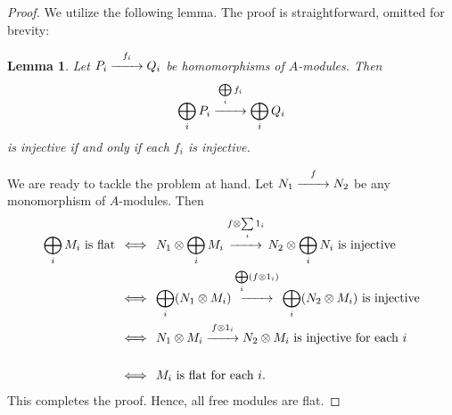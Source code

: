 \documentclass[11pt]{article}
\newtheorem{lemma}{Lemma}
\renewcommand{\longrightarrow}{\xrightarrow{\hspace*{0.7cm}}}
\begin{document}
\begin{proof}
  We utilize the following lemma. The proof is straightforward, omitted for brevity:
  \begin{adjustwidth}{0.5cm}{}
    \begin{lemma}
      Let $P_{i} \stackrel{f_{i}}{\longrightarrow}  Q_{i}$ be homomorphisms of $A$-modules. Then
      \[
        \bigoplus\limits_{i} P_{i} \stackrel{\bigoplus\limits_{i} f_{i}}{\longrightarrow} \bigoplus\limits_{i} Q_{i}
      \]
      is injective if and only if each $f_{i}$ is injective.
    \end{lemma}
  \end{adjustwidth}
  We are ready to tackle the problem at hand. Let $N_{1} \stackrel{f}{\longrightarrow} N_{2}$ be any monomorphism of $A$-modules. Then
  \begin{align*}
    \text{$\bigoplus\limits_{i} M_{i}$ is flat} \, &\iff \, N_{1} \otimes \bigoplus\limits_{i} M_{i} \stackrel{f \otimes \sum\limits_{i} 1_{i}}{\longrightarrow} N_{2} \otimes \bigoplus\limits_{i} N_{i} \text{ is injective} \\
                                                   &\iff \, \bigoplus\limits_{i} (N_{1} \otimes M_{i}) \stackrel{\bigoplus\limits_{i} (f \otimes 1_{i})}{\longrightarrow} \bigoplus\limits_{i} (N_{2} \otimes M_{i}) \text{ is injective} \\
                                                   &\iff \, N_{1} \otimes M_{i} \stackrel{f \otimes 1_{i}}{\longrightarrow} N_{2} \otimes M_{i} \text{ is injective for each } i \\ \text{ } \\
                                                   &\iff \, M_{i} \text{ is flat for each } i.
  \end{align*}
  This completes the proof. Hence, all free modules are flat.
\end{proof}

\end{document}
